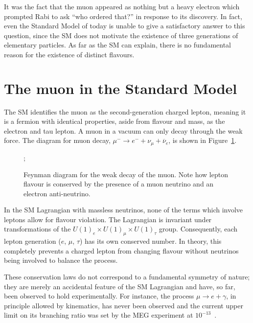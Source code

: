 It was the fact that the muon appeared as nothing but a heavy electron which
prompted Rabi to ask ``who ordered that?'' in response to its discovery. In
fact, even the Standard Model of today is unable to give a satisfactory answer
to this question, since the SM does not motivate the existence of three
generations of elementary particles. As far as the SM can explain, there is no
fundamental reason for the existence of distinct flavours.

\section{The muon in the Standard Model}
% 
The SM identifies the muon as the second-generation charged lepton, meaning it
is a fermion with identical properties, aside from flavour and mass, as the electron
and tau lepton. A muon in a vacuum can only decay through the weak force. The
diagram for muon decay, $\mu^- \rightarrow e^- +  \nu_\mu + \overline{\nu}_e$,
is shown in Figure~\ref{fig:weak_decay}.


\begin{figure}
    \centering
    ;

    \caption{ Feynman diagram for the weak decay of the muon. Note how lepton
        flavour is conserved by the presence of a muon neutrino and an electron
        anti-neutrino. }
    \label{fig:weak_decay}
\end{figure}

In the SM Lagrangian with massless neutrinos, none of the terms which involve
leptons allow for flavour violation. The Lagrangian is invariant under
transformations of the ${U(1)_e \times U(1)_\mu \times U(1)_\tau}$ group.
Consequently, each lepton generation ($e$, $\mu$, $\tau$) has its own conserved
number. In theory, this completely prevents a charged lepton from changing
flavour without neutrinos being involved to balance the process. 

These conservation laws do not correspond to a fundamental symmetry of nature;
they are merely an accidental feature of the SM Lagrangian and have, so far,
been observed to hold experimentally. 
For instance, the process ${\mu \rightarrow e + \gamma}$, in principle allowed
by kinematics, has never been observed and the current upper limit on its
branching ratio was set by the MEG experiment at
$10^{-13}$~\cite{mori2016final}. 



